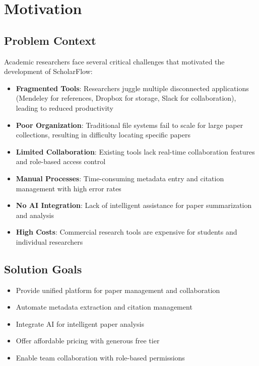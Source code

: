 \section{Motivation}
\label{sec:motivation}

\subsection{Problem Context}

Academic researchers face several critical challenges that motivated the development of ScholarFlow:

\begin{itemize}[leftmargin=*,topsep=5pt,itemsep=4pt]
    \item \textbf{Fragmented Tools}: Researchers juggle multiple disconnected applications (Mendeley for references, Dropbox for storage, Slack for collaboration), leading to reduced productivity
    
    \item \textbf{Poor Organization}: Traditional file systems fail to scale for large paper collections, resulting in difficulty locating specific papers
    
    \item \textbf{Limited Collaboration}: Existing tools lack real-time collaboration features and role-based access control
    
    \item \textbf{Manual Processes}: Time-consuming metadata entry and citation management with high error rates
    
    \item \textbf{No AI Integration}: Lack of intelligent assistance for paper summarization and analysis
    
    \item \textbf{High Costs}: Commercial research tools are expensive for students and individual researchers
\end{itemize}

\subsection{Solution Goals}

\begin{itemize}[leftmargin=*,topsep=5pt,itemsep=3pt]
    \item Provide unified platform for paper management and collaboration
    \item Automate metadata extraction and citation management
    \item Integrate AI for intelligent paper analysis
    \item Offer affordable pricing with generous free tier
    \item Enable team collaboration with role-based permissions
\end{itemize}

